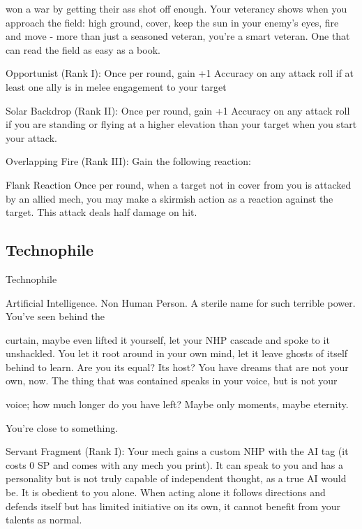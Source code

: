won a war by getting their ass shot off enough. Your veterancy shows when you approach the field: high  
ground, cover, keep the sun in your enemy’s eyes, fire and move - more than just a seasoned veteran,  
you’re a smart veteran. One that can read the field as easy as a book. 
 

Opportunist (Rank I): Once per round, gain +1 Accuracy on any attack roll if at least one ally is  
in melee engagement to your target
 
Solar Backdrop (Rank II): Once per round, gain +1 Accuracy on any attack roll if you are  
standing or flying at a higher elevation than your target when you start your attack.
 
Overlapping Fire (Rank III): Gain the following reaction:
 

                                                                                                                 


	        Flank  
         Reaction  
         Once per round, when a target not in cover from you is attacked by an allied mech, you  
         may make a skirmish action as a reaction against the target. This attack deals half  
         damage on hit.
 
\subsection{Technophile}

                                                  Technophile    

Artificial Intelligence. Non Human Person. A sterile name for such terrible power. You’ve seen behind the  

curtain, maybe even lifted it yourself, let your NHP cascade and spoke to it unshackled. You let it root  
around in your own mind, let it leave ghosts of itself behind to learn. Are you its equal? Its host? You have  
dreams that are not your own, now. The thing that was contained speaks in your voice, but is not your  

voice; how much longer do you have left? Maybe only moments, maybe eternity.  

You’re close to something.    

Servant Fragment (Rank I): Your mech gains a custom NHP with the AI tag (it costs 0 SP and  
comes with any mech you print). It can speak to you and has a personality but is not truly  
capable of independent thought, as a true AI would be. It is obedient to you alone. When acting  
alone it follows directions and defends itself but has limited initiative on its own, it cannot benefit  
from your talents as normal.
 
